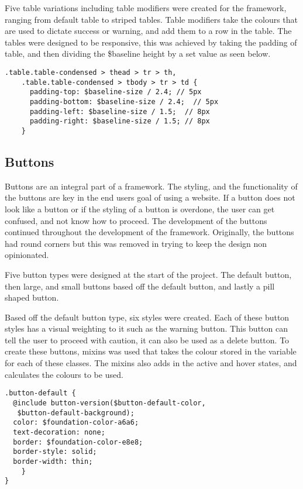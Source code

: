 Five table variations including table modifiers were created for the framework, ranging from default table to striped tables. Table modifiers take the colours that are used to dictate success or warning, and add them to a row in the table. The tables were designed to be responsive, this was achieved by taking the padding of table, and then dividing the \$baseline height by a set value as seen below. 

\begin{lstlisting}[language=CSS3]
    .table.table-condensed > thead > tr > th,
    .table.table-condensed > tbody > tr > td {
      padding-top: $baseline-size / 2.4; // 5px
      padding-bottom: $baseline-size / 2.4;  // 5px
      padding-left: $baseline-size / 1.5;  // 8px
      padding-right: $baseline-size / 1.5; // 8px
    }
\end{lstlisting}


\subsection*{Buttons}
Buttons are an integral part of a framework. The styling, and the functionality of the buttons are key in the end users goal of using a website. If a button does not look like a button or if the styling of a button is overdone, the user can get confused, and not know how to proceed. The development of the buttons continued throughout the development of the framework. Originally, the buttons had round corners but this was removed in trying to keep the design non opinionated. 

Five button types were designed at the start of the project. The default button, then large, and small buttons based off the default button, and lastly a pill shaped button. 

Based off the default button type, six styles were created. Each of these button styles has a visual weighting to it such as the warning button. This button can tell the user to proceed with caution, it can also be used as a delete button. To create these buttons, \gls{mixins} was used that takes the colour stored in the variable for each of these classes. The \gls{mixins} also adds in the active and hover states, and calculates the colours to be used. 

\begin{lstlisting}[language=CSS3]
.button-default {
  @include button-version($button-default-color,
   $button-default-background);
  color: $foundation-color-a6a6;
  text-decoration: none;
  border: $foundation-color-e8e8;
  border-style: solid;
  border-width: thin;
	}
}
\end{lstlisting}

